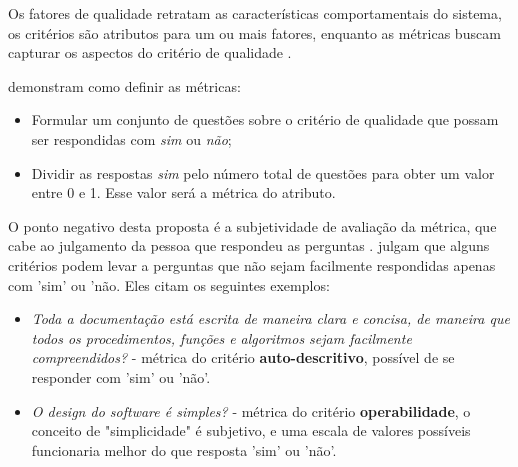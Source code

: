 \documentclass[
	12pt,				%
	openright,			%
	oneside,			%
	a4paper,			%
	english,			%
	brazil,				%
	]{abntex2}
\begin{document}
Os fatores de qualidade retratam as características comportamentais do sistema, os critérios são atributos para um ou mais fatores, enquanto as métricas buscam capturar os aspectos do critério de qualidade \cite{berander2005}.

 demonstram como definir as métricas:
\begin{itemize}
    \item Formular um conjunto de questões sobre o critério de qualidade que possam ser respondidas com \emph{sim} ou \emph{não};
    \item Dividir as respostas \emph{sim} pelo número total de questões para obter um valor entre 0 e 1. Esse valor será a métrica do atributo.
\end{itemize}

O ponto negativo desta proposta é a subjetividade de avaliação da métrica, que cabe ao julgamento da pessoa que respondeu as perguntas \cite{berander2005}.  julgam que alguns critérios podem levar a perguntas que não sejam facilmente respondidas apenas com 'sim' ou 'não. Eles citam os seguintes exemplos:
\begin{itemize}
    \item \emph{Toda a documentação está escrita de maneira clara e concisa, de maneira que todos os procedimentos, funções e algoritmos sejam facilmente compreendidos?} - métrica do critério \textbf{auto-descritivo}, possível de se responder com 'sim' ou 'não'.
    \item \emph{O design do software é simples?} - métrica do critério \textbf{operabilidade}, o conceito de "simplicidade" é subjetivo, e uma escala de valores possíveis funcionaria melhor do que resposta 'sim' ou 'não'.
\end{itemize}
\end{document}
